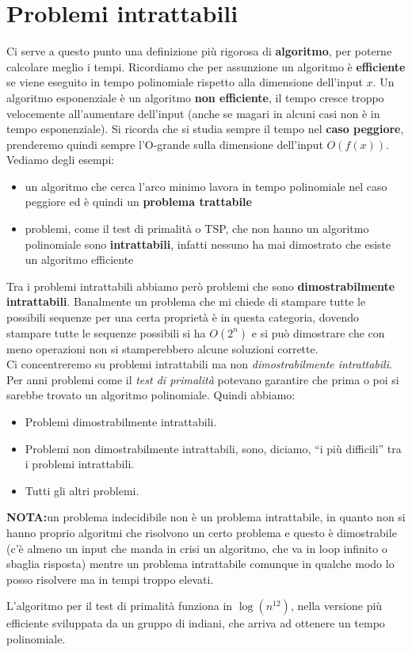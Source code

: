\section{Problemi intrattabili}
Ci serve a questo punto una definizione più rigorosa di \textbf{algoritmo}, per
poterne calcolare meglio i tempi. Ricordiamo che per assunzione un algoritmo è
\textbf{efficiente} se viene eseguito in tempo polinomiale rispetto alla dimensione
dell'input $x$. Un algoritmo esponenziale è un
algoritmo \textbf{non efficiente}, il tempo cresce troppo velocemente
all'aumentare dell'input (anche se magari in alcuni casi non è in tempo
esponenziale). Si ricorda che si studia sempre il tempo nel 
\textbf{caso peggiore}, prenderemo quindi sempre l'O-grande sulla dimensione
dell'input $O(f(x))$.\\
Vediamo degli esempi:
\begin{itemize}
  \item un algoritmo che cerca l'arco minimo lavora in tempo polinomiale nel
  caso peggiore ed è quindi un \textbf{problema trattabile}
  \item problemi, come il test di primalità o TSP, che non hanno un algoritmo
  polinomiale sono \textbf{intrattabili}, infatti nessuno ha mai dimostrato che
  esiste un algoritmo efficiente
\end{itemize}
Tra i problemi intrattabili abbiamo però problemi che sono
\textbf{dimostrabilmente intrattabili}. Banalmente un problema che mi chiede di
stampare tutte le possibili sequenze per una certa proprietà è in questa
categoria, dovendo stampare tutte le sequenze possibili si ha $O(2^n)$ e si può
dimostrare che con meno operazioni non si stamperebbero alcune soluzioni
corrette.\\
Ci concentreremo su problemi intrattabili ma non \textit{dimostrabilmente
  intrattabili}.\\
Per anni problemi come il \textit{test di primalità} potevano garantire che
prima o poi si sarebbe trovato un algoritmo polinomiale. Quindi abbiamo:
\begin{itemize}
  \item Problemi dimostrabilmente intrattabili.
  \item Problemi non dimostrabilmente intrattabili, sono, diciamo, ``i più
  difficili'' tra i problemi intrattabili.
  \item Tutti gli altri problemi.
\end{itemize}
\textbf{NOTA:}un problema indecidibile non è un problema intrattabile, in quanto non
si hanno proprio algoritmi che risolvono un certo problema e questo è
dimostrabile (c'è almeno un input che manda in crisi un algoritmo, che va in
loop infinito o sbaglia risposta) mentre un problema intrattabile comunque in
qualche modo lo posso risolvere ma in tempi troppo elevati.
\begin{shaded}
  L'algoritmo per il test di primalità funziona in $\log (n^{12})$, nella
  versione più efficiente sviluppata da un gruppo di indiani, che arriva ad
  ottenere un tempo polinomiale.
\end{shaded}
